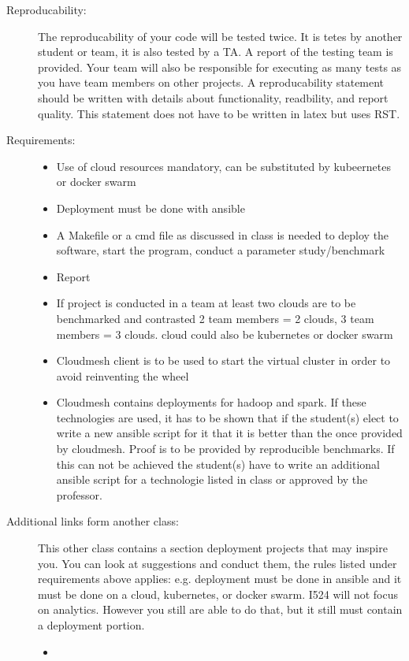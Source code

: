 \begin{description}
\item[{Reproducability:}] \leavevmode
The reproducability of your code will be tested
twice. It is tetes by another student or team, it is also tested
by a TA. A report of the testing team is provided. Your team will
also be responsible for executing as many tests as you have team
members on other projects. A reproducability statement should be
written with details about functionality, readbility, and report
quality. This statement does not have to be written in latex but
uses RST.

\item[{Requirements:}] \leavevmode\begin{itemize}
\item {} 
Use of cloud resources mandatory, can be substituted by
kubeernetes or docker swarm

\item {} 
Deployment must be done with ansible

\item {} 
A Makefile or a cmd file as discussed in class is needed to
deploy the software, start the program, conduct a
parameter study/benchmark

\item {} 
Report

\item {} 
If project is conducted in a team at least two clouds are to be
benchmarked and contrasted 2 team members = 2 clouds, 3 team
members = 3 clouds. cloud could also be kubernetes or docker
swarm

\item {} 
Cloudmesh client is to be used to start the virtual cluster in
order to avoid reinventing the wheel

\item {} 
Cloudmesh contains deployments for hadoop and spark. If these
technologies are used, it has to be shown that if the student(s)
elect to write a new ansible script for it that it is better
than the once provided by cloudmesh. Proof is to be provided by
reproducible benchmarks. If this can not be achieved the
student(s) have to write an additional ansible script for a
technologie listed in class or approved by the professor.

\end{itemize}

\item[{Additional links form another class:}] \leavevmode
This other class contains a section deployment
projects that may inspire you. You can look at suggestions and
conduct them, the rules
listed under requirements above applies: e.g. deployment must be
done in ansible and it must be done on a cloud, kubernetes, or
docker swarm. I524 will not focus on analytics. However you still
are able to do that, but it still must contain a deployment
portion.
\begin{itemize}
\item {} 

\end{itemize}

\end{description}


